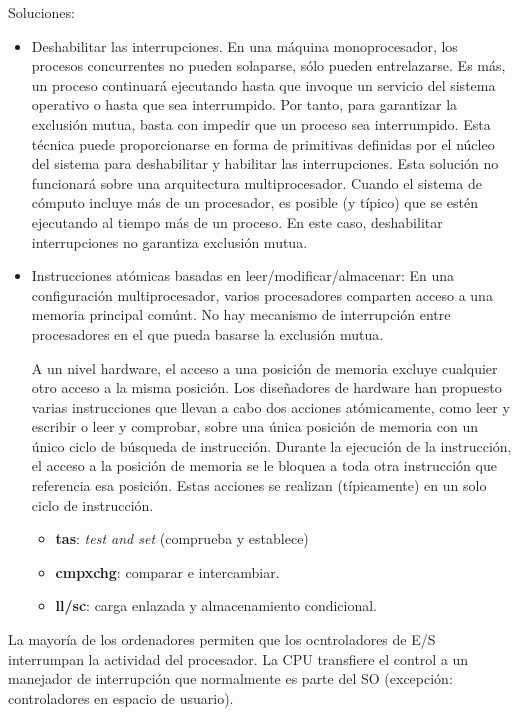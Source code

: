 \documentclass{article}
\begin{document}
Soluciones:
\begin{itemize}
\item Deshabilitar las interrupciones. En una máquina monoprocesador, los procesos concurrentes no pueden solaparse, sólo pueden entrelazarse. Es más, un proceso continuará ejecutando hasta que invoque un servicio del sistema operativo o hasta que sea interrumpido. Por tanto, para garantizar la exclusión mutua, basta con impedir que un proceso sea interrumpido. Esta técnica puede proporcionarse en forma de primitivas definidas por el núcleo del sistema para deshabilitar y habilitar las interrupciones. Esta solución no funcionará sobre una arquitectura multiprocesador. Cuando el sistema de cómputo incluye más de un procesador, es posible (y típico) que se estén ejecutando al tiempo más de un proceso. En este caso, deshabilitar interrupciones no garantiza exclusión mutua.

\item Instrucciones atómicas basadas en leer/modificar/almacenar: En una configuración multiprocesador, varios procesadores comparten acceso a una memoria principal comúnt. No hay mecanismo de interrupción entre procesadores en el que pueda basarse la exclusión mutua. 

A un nivel hardware, el acceso a una posición de memoria excluye cualquier otro acceso a la misma posición. Los diseñadores de hardware han propuesto varias instrucciones que llevan a cabo dos acciones atómicamente, como leer y escribir o leer y comprobar, sobre una única posición de memoria con un único ciclo de búsqueda de instrucción. Durante la ejecución de la instrucción, el acceso a la posición de memoria se le bloquea a toda otra instrucción que referencia esa posición. Estas acciones se realizan (típicamente) en un solo ciclo de instrucción.
	\begin{itemize}
	\item \textbf{tas}: \textit{test and set} (comprueba y establece)
	
	\item \textbf{cmpxchg}: comparar e intercambiar.
	
	\item \textbf{ll/sc}: carga enlazada y almacenamiento condicional.
	\end{itemize}
\end{itemize}

La mayoría de los ordenadores permiten que los ocntroladores de E/S interrumpan la actividad del procesador. La CPU transfiere el control a un manejador de interrupción que normalmente es parte del SO (excepción: controladores en espacio de usuario).
\end{document}

